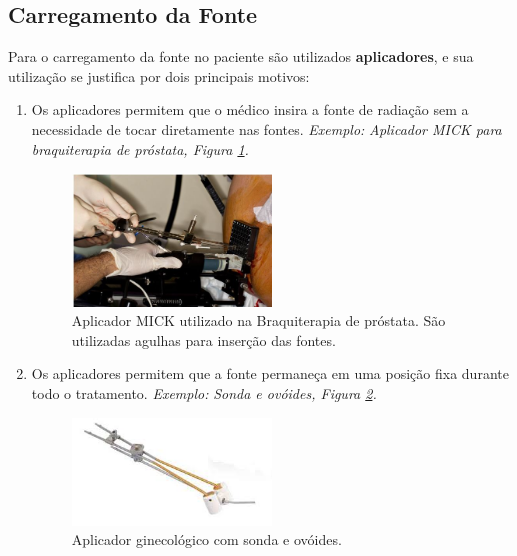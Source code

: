 \documentclass[11pt,a4paper]{article}
\begin{document}
		\subsection{Carregamento da Fonte}

			Para o carregamento da fonte no paciente são utilizados \textbf{aplicadores}, e sua utilização se justifica por dois principais motivos:

			\begin{enumerate}
				\item Os aplicadores permitem que o médico insira a fonte de radiação sem a necessidade de tocar diretamente nas fontes. \textit{\textcolor{CarnationPink}{Exemplo:}} \textit{Aplicador MICK para braquiterapia de próstata, Figura \ref{img:aplicadorMick}.}

				\begin{figure}[h]
					\centering
					\includegraphics[width=0.5\textwidth]{Imagens/aplicadorMick.JPG}
					\caption{Aplicador MICK utilizado na Braquiterapia de próstata. São utilizadas agulhas para inserção das fontes.}
					\label{img:aplicadorMick}
				\end{figure}

				\item Os aplicadores permitem que a fonte permaneça em uma posição fixa durante todo o tratamento. \textit{\textcolor{CarnationPink}{Exemplo:}} \textit{Sonda e ovóides, Figura \ref{img:aplicadorSondaEOvoides}.}
				
				\begin{figure}[h]
					\centering
					\includegraphics[width=0.5\textwidth]{Imagens/aplicadorSondaEOvoides.jpg}
					\caption{Aplicador ginecológico com sonda e ovóides.}
					\label{img:aplicadorSondaEOvoides}
				\end{figure}
			\end{enumerate}
\end{document}
